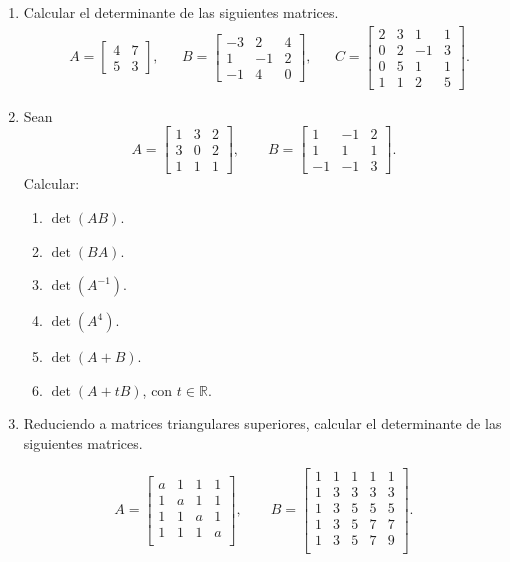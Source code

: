 \begin{enumerate}[topsep=6pt,itemsep=.4cm]
\item Calcular el determinante de las siguientes matrices.
	\begin{align*}
	&A=\begin{bmatrix} 4&7\\ 5&3\end{bmatrix},
	&&B=\begin{bmatrix} -3&2&4\\ 1&-1&2\\ -1&4&0\end{bmatrix},
	&&
	C=\begin{bmatrix} 2&3&1&1\\ 0&2&-1&3 \\ 0&5&1&1 \\1&1&2&5\end{bmatrix}.
	\end{align*}


\item Sean
		$$A=
	\begin{bmatrix}
		1&3&2 \\
		3&0&2 \\
		1&1&1
	\end{bmatrix}, \qquad
	B =
	\begin{bmatrix}
		1&-1&2\\
		1&1&1 \\
		-1&-1&3
	\end{bmatrix}.
	$$
	Calcular:
	\begin{multicols}{3}
	\begin{enumerate}
		\item $\det(AB)$.
		\item $\det(BA)$.
		\item $\det(A^{-1})$.
		\item $\det(A^{4})$.
		\item $\det(A+B)$.
		\item $\det(A+tB)$, con $t \in \mathbb{R}$.
	\end{enumerate}
\end{multicols}


\item Reduciendo a matrices triangulares superiores, calcular el determinante de las siguientes matrices.

		$$A =
		\begin{bmatrix}
			a&1&1&1 \\
			1&a&1&1 \\
			1&1&a&1 \\
			1&1&1&a \\
		\end{bmatrix}, \qquad	
        B =
		\begin{bmatrix}
			1&1&1&1&1 \\
			1&3&3&3&3 \\
			1&3&5&5&5 \\
			1&3&5&7&7 \\
			1&3&5&7&9 \\
		\end{bmatrix}.
		$$


\end{enumerate}
